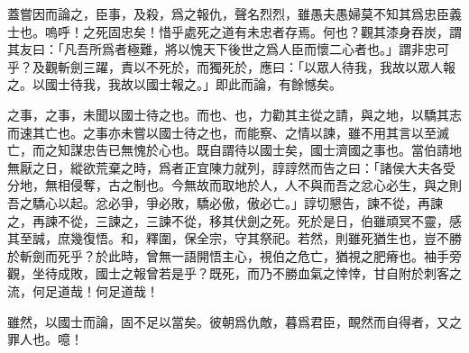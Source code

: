蓋嘗因而論之，臣事，及殺，爲之報仇，聲名烈烈，雖愚夫愚婦莫不知其爲忠臣義士也。嗚呼！之死固忠矣！惜乎處死之道有未忠者存焉。何也？觀其漆身吞炭，謂其友曰：「凡吾所爲者極難，將以愧天下後世之爲人臣而懷二心者也。」謂非忠可乎？及觀斬{劍}三躍，責以不死於，而獨死於，應曰：「以眾人待我，我故以眾人報之。以國士待我，我故以國士報之。」即此而論，有餘憾矣。%

之事，之事，未聞以國士待之也。而也、也，力勸其主從之請，與之地，以驕其志而速其亡也。之事亦未嘗以國士待之也，而能察、之情以諫，雖不用其言以至滅亡，而之知謀忠告已無愧於心也。既自謂待以國士矣，國士濟國之事也。當伯請地無厭之日，縱欲荒{棄}之時，爲者正宜陳力就列，諄諄然而告之曰：「諸侯大夫各{受}分地，無相侵奪，古之制也。今無故而取地於人，人不與而吾之忿心必生，與之則吾之驕心以起。忿必爭，爭必敗，驕必傲，傲必亡。」諄切懇告，諫不從，再諫之，再諫不從，三諫之，三諫不從，移其伏劍之死。死於是日，伯雖頑冥不靈，感其至誠，庶幾復悟。和，釋圍，保全宗，守其祭祀。若然，則雖死猶生也，豈不勝於斬{劍}而死乎？於此時，曾無一語開悟主心，視伯之危亡，猶視之肥瘠也。袖手旁觀，坐待成敗，國士之報曾若是乎？既死，而乃不勝血氣之悻悻，甘自附於刺客之流，何足道哉！何足道哉！%

雖然，以國士而論，固不足以當矣。彼朝爲仇敵，暮爲君臣，靦然而自得者，又之罪人也。噫！

\theendnotes

